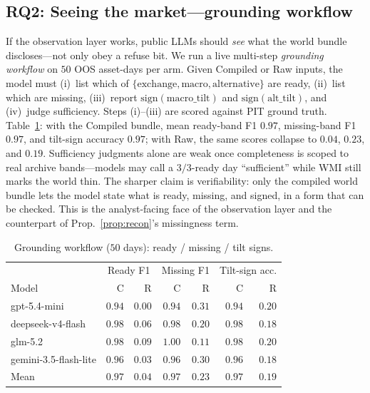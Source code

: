 \documentclass[sigconf,anonymous]{acmart}
\theoremstyle{acmdefinition}%
\theoremstyle{acmplain}%
\begin{document}
\subsection{RQ2: Seeing the market---grounding workflow}
\label{sec:grounding}
If the observation layer works, public LLMs should \emph{see} what the world bundle discloses---not only obey a refuse bit.
We run a live multi-step \emph{grounding workflow} on \(50\) OOS asset-days per arm.
Given Compiled or Raw inputs, the model must (i)~list which of \(\{\mathrm{exchange},\mathrm{macro},\mathrm{alternative}\}\) are ready,
(ii)~list which are missing, (iii)~report \(\mathrm{sign}(\mathrm{macro\_tilt})\) and \(\mathrm{sign}(\mathrm{alt\_tilt})\),
and (iv)~judge sufficiency.
Steps (i)--(iii) are scored against PIT ground truth.
Table~\ref{tab:grounding}: with the Compiled bundle, mean ready-band F1 \(0.97\), missing-band F1 \(0.97\), and tilt-sign accuracy \(0.97\);
with Raw, the same scores collapse to \(0.04\), \(0.23\), and \(0.19\).
Sufficiency judgments alone are weak once completeness is scoped to real archive bands---models may call a \(3/3\)-ready day ``sufficient'' while WMI still marks the world thin.
The sharper claim is verifiability: only the compiled world bundle lets the model state what is ready, missing, and signed, in a form that can be checked.
This is the analyst-facing face of the observation layer and the counterpart of Prop.~\ref{prop:recon}'s missingness term.

\begin{table}[t]
  \caption{Grounding workflow ($50$ days): ready / missing / tilt signs.}
  \label{tab:grounding}
  \small
  \begin{tabular}{lrrrrrr}
    \toprule
    & \multicolumn{2}{c}{Ready F1} & \multicolumn{2}{c}{Missing F1} & \multicolumn{2}{c}{Tilt-sign acc.} \\
    Model & C & R & C & R & C & R \\
    \midrule
    gpt-5.4-mini & $0.94$ & $0.00$ & $0.94$ & $0.31$ & $0.94$ & $0.20$ \\
    deepseek-v4-flash & $0.98$ & $0.06$ & $0.98$ & $0.20$ & $0.98$ & $0.18$ \\
    glm-5.2 & $0.98$ & $0.09$ & $1.00$ & $0.11$ & $0.98$ & $0.20$ \\
    gemini-3.5-flash-lite & $0.96$ & $0.03$ & $0.96$ & $0.30$ & $0.96$ & $0.18$ \\
    \midrule
    Mean & $0.97$ & $0.04$ & $0.97$ & $0.23$ & $0.97$ & $0.19$ \\
    \bottomrule
  \end{tabular}
\end{table}
\end{document}
